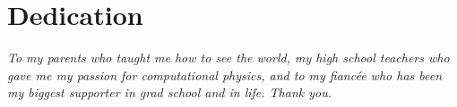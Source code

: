 \newpage
{}

\section*{\large Dedication}

\begin{center}
\emph{To my parents who taught me how to see the world, my high school teachers who gave me my passion for computational physics, and to my fiancée who has been my biggest supporter in grad school and in life. Thank you.}
\end{center}
